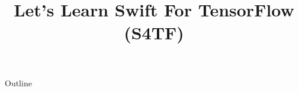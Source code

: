 \documentclass[xcolor=dvipsnames,compress,t,pdf]{beamer}
\title[\insertframenumber /\inserttotalframenumber]{Let's Learn Swift For TensorFlow (S4TF)}
\begin{document}
	\begin{frame}
	\titlepage
	\end{frame}
	
	\begin{frame}{Outline}
	    \tableofcontents
	\end{frame}

	
	
	
\end{document}
